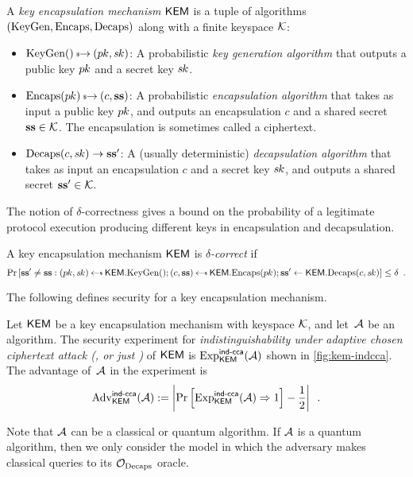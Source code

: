 \documentclass{iacrcc}
\begin{document}
\begin{definition}
A \emph{key encapsulation mechanism} $\textsf{\upshape\mdseries KEM}$ is a tuple of algorithms
$(\textrm{\upshape\mdseries KeyGen},\textrm{\upshape\mdseries Encaps},\textrm{\upshape\mdseries Decaps})$ along with a finite keyspace $\mathcal{K}$:
\begin{itemize}
\item $\KeyGen() \tor (\pk, \sk)$: A probabilistic \emph{key generation algorithm} that outputs a public key $p\mkern-0.5muk$ and a secret key $s\mkern-1muk$.
\item $\Encaps(\pk) \tor (c, \ssk)$: A probabilistic \emph{encapsulation algorithm} that takes as input a public key $p\mkern-0.5muk$, and outputs an encapsulation $c$ and a shared secret $\mathbf{s}\mathbf{s} \in \mathcal{K}$.  The encapsulation is sometimes called a ciphertext.
\item $\textrm{\upshape\mdseries Decaps}(c, s\mkern-1muk) \to \mathbf{s}\mathbf{s}'$: A (usually deterministic) \emph{decapsulation algorithm} that takes as input an encapsulation $c$ and a secret key $s\mkern-1muk$, and outputs a shared secret $\mathbf{s}\mathbf{s}' \in \mathcal{K}$.
\end{itemize}
\end{definition}

The notion of $\delta$-correctness gives a bound on the probability of a legitimate protocol execution producing different keys in encapsulation and decapsulation. 

\begin{definition}
A key encapsulation mechanism $\textsf{\upshape\mdseries KEM}$ is \emph{$\delta$-correct} if
\[ \Pr\left[ \ssk' \ne \ssk : (\pk, \sk) \getsr \KEM.\KeyGen(); (c, \ssk) \getsr \KEM.\Encaps(\pk);  \ssk' \gets \KEM.\Decaps(c, \sk) \right] \le \delta\enspace . \]
\end{definition}

The following defines \INDCCA security for a key encapsulation mechanism.

\begin{definition}
  Let $\textsf{\upshape\mdseries KEM}$ be a key encapsulation mechanism with keyspace $\mathcal{K}$,
  and let~$\mathcal{A}$ be an algorithm.  The security experiment for
  \emph{indistinguishability under adaptive chosen ciphertext attack
    (\INDCCATwo, or just \INDCCA)} of $\textsf{\upshape\mdseries KEM}$ is
  $\mathrm{Exp}^{\textsf{\upshape\mdseries \textsf{\upshape\mdseries ind-cca}}}_{\textsf{\upshape\mdseries KEM}}(\mathcal{A})$ shown in \autoref{fig:kem-indcca}.
  The advantage of~$\mathcal{A}$ in the experiment is
\[ \mathrm{Adv}^{\textsf{\upshape\mdseries \textsf{\upshape\mdseries ind-cca}}}_{\textsf{\upshape\mdseries KEM}}(\mathcal{A}) := \left| \Pr\left[ \mathrm{Exp}^{\textsf{\upshape\mdseries \textsf{\upshape\mdseries ind-cca}}}_{\textsf{\upshape\mdseries KEM}}(\mathcal{A}) \Rightarrow 1 \right] - \frac{1}{2} \right| \enspace . \]
\end{definition}

Note that $\mathcal{A}$ can be a classical or quantum algorithm.  If
$\mathcal{A}$ is a quantum algorithm, then we only consider the model
in which the adversary makes classical queries to its $\mathcal{O}_{\mathrm{Decaps}}$ oracle.
\end{document}
